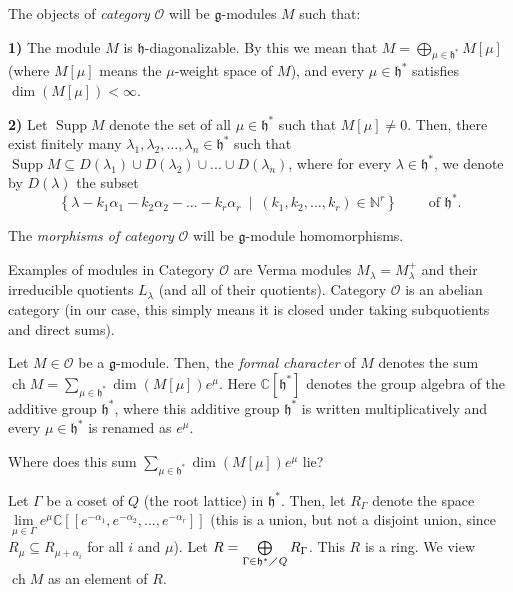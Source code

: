 \documentclass[etingof-lie.tex]{subfiles}
\begin{document}
\begin{definition}
\label{def.O}The objects of \textit{category }$\mathcal{O}$ will be
$\mathfrak{g}$-modules $M$ such that:

\textbf{1)} The module $M$ is $\mathfrak{h}$-diagonalizable. By this we mean
that $M=\bigoplus\limits_{\mu\in\mathfrak{h}^{\ast}}M\left[  \mu\right]  $
(where $M\left[  \mu\right]  $ means the $\mu$-weight space of $M$), and every
$\mu\in\mathfrak{h}^{\ast}$ satisfies $\dim\left(  M\left[  \mu\right]
\right)  <\infty$.

\textbf{2)} Let $\operatorname*{Supp}M$ denote the set of all $\mu
\in\mathfrak{h}^{\ast}$ such that $M\left[  \mu\right]  \neq0$. Then, there
exist finitely many $\lambda_{1},\lambda_{2},...,\lambda_{n}\in\mathfrak{h}%
^{\ast}$ such that $\operatorname*{Supp}M\subseteq D\left(  \lambda
_{1}\right)  \cup D\left(  \lambda_{2}\right)  \cup...\cup D\left(
\lambda_{n}\right)  $, where for every $\lambda\in\mathfrak{h}^{\ast}$, we
denote by $D\left(  \lambda\right)  $ the subset%
\[
\left\{  \lambda-k_{1}\alpha_{1}-k_{2}\alpha_{2}-...-k_{r}\alpha_{r}%
\ \mid\ \left(  k_{1},k_{2},...,k_{r}\right)  \in\mathbb{N}^{r}\right\}
\ \ \ \ \ \ \ \ \ \ \text{of }\mathfrak{h}^{\ast}.
\]


The \textit{morphisms of category }$\mathcal{O}$ will be $\mathfrak{g}$-module homomorphisms.
\end{definition}

Examples of modules in Category $\mathcal{O}$ are Verma modules $M_{\lambda
}=M_{\lambda}^{+}$ and their irreducible quotients $L_{\lambda}$ (and all of
their quotients). Category $\mathcal{O}$ is an abelian category (in our case,
this simply means it is closed under taking subquotients and direct sums).

\begin{definition}
Let $M\in\mathcal{O}$ be a $\mathfrak{g}$-module. Then, the \textit{formal
character} of $M$ denotes the sum $\operatorname*{ch}M=\sum\limits_{\mu
\in\mathfrak{h}^{\ast}}\dim\left(  M\left[  \mu\right]  \right)  e^{\mu}$.
Here $\mathbb{C}\left[  \mathfrak{h}^{\ast}\right]  $ denotes the group
algebra of the additive group $\mathfrak{h}^{\ast}$, where this additive group
$\mathfrak{h}^{\ast}$ is written multiplicatively and every $\mu
\in\mathfrak{h}^{\ast}$ is renamed as $e^{\mu}$.

Where does this sum $\sum\limits_{\mu\in\mathfrak{h}^{\ast}}\dim\left(
M\left[  \mu\right]  \right)  e^{\mu}$ lie?

Let $\Gamma$ be a coset of $Q$ (the root lattice) in $\mathfrak{h}^{\ast}$.
Then, let $R_{\Gamma}$ denote the space $\lim\limits_{\mu\in\Gamma}e^{\mu
}\mathbb{C}\left[  \left[  e^{-\alpha_{1}},e^{-\alpha_{2}},...,e^{-\alpha_{r}%
}\right]  \right]  $ (this is a union, but not a disjoint union, since
$R_{\mu}\subseteq R_{\mu+\alpha_{i}}$ for all $i$ and $\mu$). Let
$R=\bigoplus\limits_{\Gamma\in\mathfrak{h}^{\ast}\diagup Q}R_{\Gamma}$. This
$R$ is a ring. We view $\operatorname*{ch}M$ as an element of $R$.
\end{definition}
\end{document}
